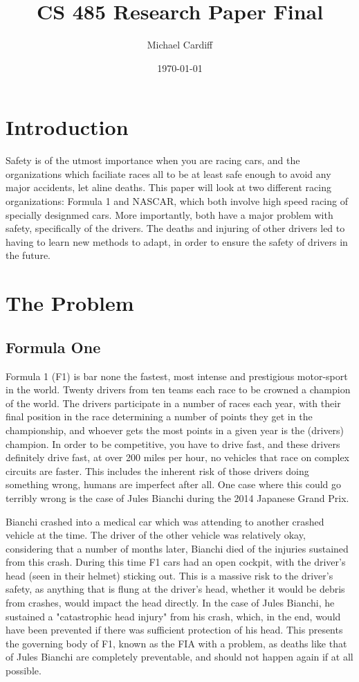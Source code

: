 \documentclass[letterpaper, 12pt]{article}
\title{CS 485 Research Paper Final}
\author{Michael Cardiff}
\date{\today}
\numberwithin{figure}{section}
\begin{document}
\maketitle\nocite{*}
\section{Introduction}
Safety is of the utmost importance when you are racing cars, and the organizations which faciliate races all to be at least safe enough to avoid any major accidents, let aline deaths. This paper will look at two different racing organizations: Formula 1 and NASCAR, which both involve high speed racing of specially designmed cars. More importantly, both have a major problem with safety, specifically of the drivers. The deaths and injuring of other drivers led to having to learn new methods to adapt, in order to ensure the safety of drivers in the future.

\section{The Problem}
\subsection{Formula One}
Formula 1 (F1) is bar none the fastest, most intense and prestigious motor-sport in the world. Twenty drivers from ten teams each race to be crowned a champion of the world. The drivers participate in a number of races each year, with their final position in the race determining a number of points they get in the championship, and whoever gets the most points in a given year is the (drivers) champion. In order to be competitive, you have to drive fast, and these drivers definitely drive fast, at over 200 miles per hour, no vehicles that race on complex circuits are faster. This includes the inherent risk of those drivers doing something wrong, humans are imperfect after all. One case where this could go terribly wrong is the case of Jules Bianchi during the 2014 Japanese Grand Prix.

Bianchi crashed into a medical car which was attending to another crashed vehicle at the time. The driver of the other vehicle was relatively okay, considering that a number of months later, Bianchi died of the injuries sustained from this crash. During this time F1 cars had an open cockpit, with the driver's head (seen in their helmet) sticking out. This is a massive risk to the driver's safety, as anything that is flung at the driver's head, whether it would be debris from crashes, would impact the head directly. In the case of Jules Bianchi, he sustained a "catastrophic head injury" \cite{halogood} from his crash, which, in the end, would have been prevented if there was sufficient protection of his head. This presents the governing body of F1, known as the FIA with a problem, as deaths like that of Jules Bianchi are completely preventable, and should not happen again if at all possible.
\end{document}
